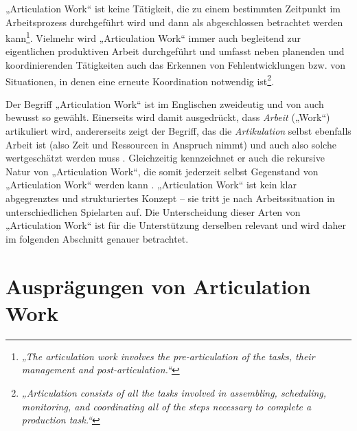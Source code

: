 „Articulation Work“ ist keine Tätigkeit, die zu einem bestimmten Zeitpunkt im Arbeitsprozess durchgeführt wird und dann als abgeschlossen betrachtet werden kann\footnote{\emph{„The articulation work involves the pre-articulation of the tasks, their management and post-articulation.“}\citep[][S. 121]{Raposo04}}. Vielmehr wird „Articulation Work“ immer auch begleitend zur eigentlichen produktiven Arbeit durchgeführt und umfasst neben planenden und koordinierenden Tätigkeiten auch das Erkennen von Fehlentwicklungen bzw. von Situationen, in denen eine erneute Koordination notwendig ist\footnote{\emph{„Articulation consists of all the tasks involved in assembling, scheduling, monitoring, and coordinating all of the steps necessary to complete a production task.“}\citep[][S. 266]{Gerson86}}. 

Der Begriff „Articulation Work“ ist im Englischen zweideutig und von \citeauthor{Strauss85} auch bewusst so gewählt. Einerseits wird damit ausgedrückt, dass \emph{Arbeit} („Work“) artikuliert wird, andererseits zeigt der Begriff, das die \emph{Artikulation} selbst ebenfalls Arbeit ist (also Zeit und Ressourcen in Anspruch nimmt) und auch also solche wertgeschätzt werden muss \citep{Fujimura87}. Gleichzeitig kennzeichnet er auch die rekursive Natur von „Articulation Work“, die somit jederzeit selbst Gegenstand von „Articulation Work“ werden kann \citep{Star99}. „Articulation Work“ ist kein klar abgegrenztes und strukturiertes Konzept -- sie tritt je nach Arbeitssituation in unterschiedlichen Spielarten auf. Die Unterscheidung dieser Arten von „Articulation Work“ ist für die Unterstützung derselben relevant und wird daher im folgenden Abschnitt genauer betrachtet.

\section{Ausprägungen von Articulation Work} %
\label{sec:arten_von_articulation_work}

